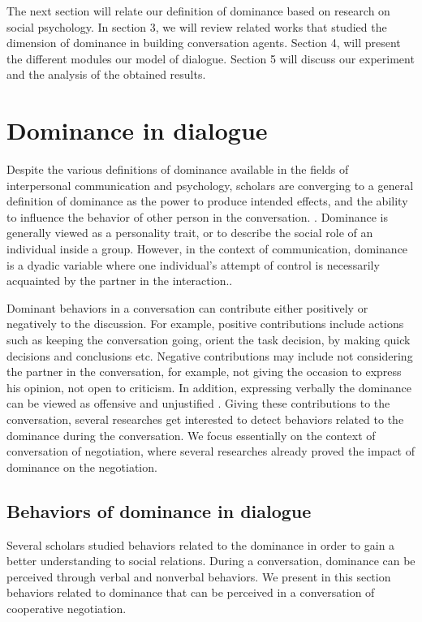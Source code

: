 \documentclass{llncs}
\begin{document}
	The next section will relate our definition of dominance based on research on social psychology. In section 3, we will review related works that studied the dimension of dominance in building conversation agents. Section 4, will present the different modules our model of dialogue. Section 5 will discuss our experiment and the analysis of the obtained results. 
	
	
	\section{Dominance in dialogue}
	\par Despite the various definitions of dominance available in the fields of interpersonal communication and psychology, scholars are converging to a general definition of dominance as the power to produce intended effects, and the ability to influence the behavior of other person in the conversation. \cite{dunbar2005perceptions}. Dominance is generally viewed as a personality trait, or to describe the social role of an individual inside a group. However, in the context of communication, dominance is a dyadic variable where one individual's attempt of control is necessarily acquainted by the partner in the interaction.\cite{dunbar2005perceptions}. 
	\par Dominant behaviors in a conversation can contribute either positively or negatively to the discussion. For example, positive contributions include actions such as keeping the conversation going, orient the task decision, by making quick decisions and conclusions etc. Negative contributions may include not considering the partner in the conversation, for example, not giving the occasion to express his opinion, not open to criticism. In addition, expressing verbally the dominance can be viewed as offensive and unjustified \cite{zablotskaya2012relating}. Giving these contributions to the conversation, several researches get interested to detect behaviors related to the dominance during the conversation. We focus essentially on the context of conversation of negotiation, where several researches already proved the impact of dominance on the negotiation\cite{van2006power}.
	
	\subsection{Behaviors of dominance in dialogue}
	Several scholars studied behaviors related to the dominance in order to gain a better understanding to social relations. During a conversation, dominance can be perceived through verbal and nonverbal behaviors. We present in this section behaviors related to dominance that can be perceived in a conversation of cooperative negotiation.
\end{document}
